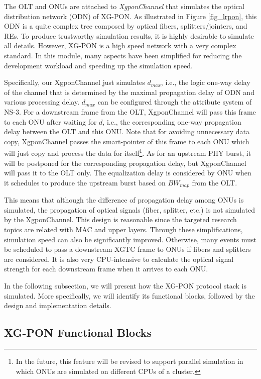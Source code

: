 The OLT and ONUs are attached to \emph{XgponChannel} that
simulates the optical distribution network (ODN) of XG-PON. As
illustrated in Figure \ref{fig_lrpon}, this ODN is a quite complex
tree composed by optical fibers, splitters/jointers, and REs. To
produce trustworthy simulation results, it is highly desirable to
simulate all details. However, XG-PON is a high speed network with
a very complex standard. In this module, many aspects have been
simplified for reducing the development workload and speeding up
the simulation speed.

Specifically, our XgponChannel just simulates $d_{max}$, i.e., the
logic one-way delay of the channel that is determined by the
maximal propagation delay of ODN and various processing delay.
$d_{max}$ can be configured through the attribute system of NS-3.
For a downstream frame from the OLT, XgponChannel will pass this
frame to each ONU after waiting for $d$, i.e., the corresponding
one-way propagation delay between the OLT and this ONU. Note that
for avoiding unnecessary data copy, XgponChannel passes the
smart-pointer of this frame to each ONU which will just copy and
process the data for itself\footnote{In the future, this feature
will be revised to support parallel simulation in which ONUs are
simulated on different CPUs of a cluster.}. As for an upstream PHY
burst, it will be postponed for the corresponding propagation
delay, but XgponChannel will pass it to the OLT only. The
equalization delay is considered by ONU when it schedules to
produce the upstream burst based on $BW_{map}$ from the OLT.


This means that although the difference of propagation delay among
ONUs is simulated, the propagation of optical signals (fiber,
splitter, etc.) is not simulated by the XgponChannel. This design
is reasonable since the targeted research topics are related with
MAC and upper layers. Through these simplifications, simulation
speed can also be significantly improved. Otherwise, many events
must be scheduled to pass a downstream XGTC frame to ONUs if
fibers and splitters are considered. It is also very CPU-intensive
to calculate the optical signal strength for each downstream frame
when it arrives to each ONU.


In the following subsection, we will present how the XG-PON
protocol stack is simulated. More specifically, we will identify
its functional blocks, followed by the design and implementation
details.




\subsection{XG-PON Functional Blocks}


